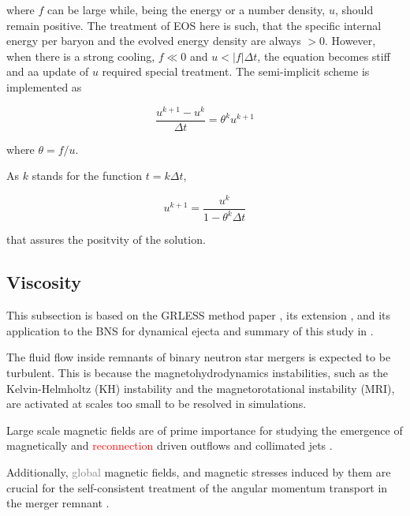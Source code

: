 \documentclass[11pt,a4paper,headinclude=true,DIV=14,BCOR=8mm,chapterprefix,listof=totoc,twoside,openright,abstracton]{scrbook}
\newcommand{\red}[1]{\textcolor{red}{#1}}
\newcommand{\gray}[1]{\textcolor{gray}{#1}}
\begin{document}
where $f$ can be large while, being the energy or a number density, $u$, should remain positive.
The treatment of EOS here is such, that the specific internal energy per baryon and the evolved energy density are always $>0$. However, when there is a strong cooling, $f\ll0$ and $u<|f|\Delta t$, 
the equation becomes stiff and aa update of $u$ required special treatment. 
The semi-implicit scheme is implemented as 

\begin{equation}
\frac{u^{k+1}-u^{k}}{\Delta t} = \theta^k u^{k+1}
\end{equation}

where $\theta = f/u$.

As $k$ stands for the function $t=k\Delta t$,

\begin{equation}
u^{k+1} = \frac{u^{k}}{1-\theta^k \Delta t}
\end{equation}

that assures the positvity of the solution.



\subsection{Viscosity}


This subsection is based on the GRLESS method paper \cite{Radice:2017zta}, its extension  \cite{Radice:2020ids}, and its application to the BNS \cite{Radice:2017lry} for dynamical ejecta and summary of this study in \cite{Radice:2018pdn}.


The fluid flow inside remnants of binary neutron star mergers is expected to be turbulent. 
This is because the magnetohydrodynamics instabilities,
such as the Kelvin-Helmholtz (KH) instability and the magnetorotational instability (MRI), are  
activated at scales too small to be resolved in simulations.

Large scale magnetic fields are of prime importance for studying the emergence of magnetically and \red{reconnection} driven outflows and collimated jets \cite{Rezzolla:2011da,Bucciantini:2011kx,Siegel:2014ita,Ruiz:2016rai,Metzger:2018uni}.

Additionally, \gray{global} magnetic fields, and magnetic stresses induced by them are crucial for the self-consistent treatment of the angular momentum transport in the merger remnant \cite{Duez:2006qe,Kiuchi:2014hja,Guilet:2016sqd,Kiuchi:2017zzg}.
\end{document}

